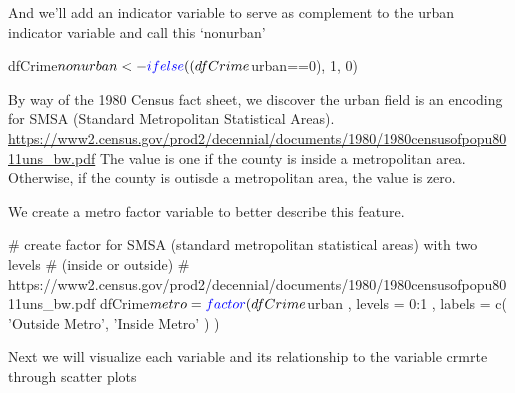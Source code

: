 \documentclass[]{article}
\newenvironment{Shaded}{}{}
\newcommand{\CommentTok}[1]{\textcolor[rgb]{0.00,0.50,0.00}{#1}}
\newcommand{\DataTypeTok}[1]{#1}
\newcommand{\DecValTok}[1]{#1}
\newcommand{\KeywordTok}[1]{\textcolor[rgb]{0.00,0.00,1.00}{#1}}
\newcommand{\NormalTok}[1]{#1}
\newcommand{\OperatorTok}[1]{#1}
\newcommand{\StringTok}[1]{\textcolor[rgb]{0.00,0.50,0.50}{#1}}
\begin{document}
And we'll add an indicator variable to serve as complement to the urban
indicator variable and call this `nonurban'

\begin{Shaded}
\begin{Highlighting}[]
\NormalTok{dfCrime}\OperatorTok{$}\NormalTok{nonurban <-}\StringTok{ }\KeywordTok{ifelse}\NormalTok{((dfCrime}\OperatorTok{$}\NormalTok{urban}\OperatorTok{==}\DecValTok{0}\NormalTok{), }\DecValTok{1}\NormalTok{, }\DecValTok{0}\NormalTok{)}
\end{Highlighting}
\end{Shaded}

By way of the 1980 Census fact sheet, we discover the urban field is an
encoding for SMSA (Standard Metropolitan Statistical Areas).
\url{https://www2.census.gov/prod2/decennial/documents/1980/1980censusofpopu8011uns_bw.pdf}
The value is one if the county is inside a metropolitan area. Otherwise,
if the county is outisde a metropolitan area, the value is zero.

We create a metro factor variable to better describe this feature.

\begin{Shaded}
\begin{Highlighting}[]
\CommentTok{# create factor for SMSA (standard metropolitan statistical areas) with two levels }
\CommentTok{# (inside or outside)}
\CommentTok{#    https://www2.census.gov/prod2/decennial/documents/1980/1980censusofpopu8011uns_bw.pdf}
\NormalTok{dfCrime}\OperatorTok{$}\NormalTok{metro =}
\StringTok{            }\KeywordTok{factor}\NormalTok{( dfCrime}\OperatorTok{$}\NormalTok{urban , }\DataTypeTok{levels =} \DecValTok{0}\OperatorTok{:}\DecValTok{1}\NormalTok{ , }\DataTypeTok{labels =}
                    \KeywordTok{c}\NormalTok{( }\StringTok{'Outside Metro'}\NormalTok{,}
                       \StringTok{'Inside Metro'}
\NormalTok{                      )}
\NormalTok{                   )}
\end{Highlighting}
\end{Shaded}

Next we will visualize each variable and its relationship to the
variable crmrte through scatter plots
\end{document}
